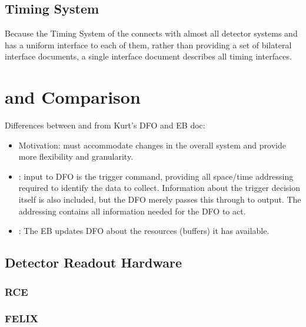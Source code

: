 \subsection{Timing System}
Because the Timing System of the   connects with
almost all detector systems and has a uniform interface to each of
them, rather than providing a set of 
bilateral interface documents, a single interface document
 describes all timing interfaces. 

\section{ and  Comparison}


Differences between  and  from Kurt's DFO and EB doc:
\begin{itemize}
\item Motivation: must accommodate changes in the overall system and provide more flexibility and granularity.
\item {}: input to DFO is the trigger command, providing all space/time addressing required to identify the data to collect.  Information about the trigger decision itself is also included, but the DFO merely passes this through to output.  The addressing contains all information needed for the DFO to act.
\item {}: The EB updates DFO about the resources (buffers) it has available.
\end{itemize}

\subsection{Detector Readout Hardware}


\subsubsection{RCE}

\subsubsection{FELIX}

